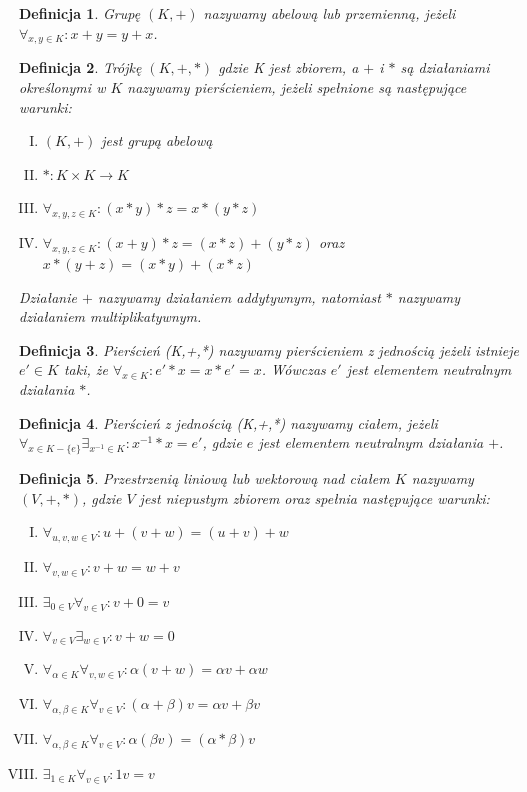 \documentclass[12pt,a4paper]{article}
\newtheorem{df}{Definicja}[section]
\begin{document}
\begin{df} 
Grup\k{e} $(K,+)$ nazywamy abelow\k{a} lub przemienn\k{a}, je\.zeli $\forall_{x,y\in K}: x+y=y+x$.
\end{df}
\begin{df} 
Tr\'ojk\k{e} $(K,+,*)$ gdzie K jest zbiorem, a $+$ i $*$ s\k{a} dzia{\l}aniami okre\'slonymi w $K$ nazywamy pier\'scieniem, je\.zeli spe{\l}nione s\k{a} nast\k{e}puj\k{a}ce warunki:
\begin{enumerate}[I.]
\item $(K,+)$ jest grup\k{a} abelow\k{a} 
\item $*:K\times K \rightarrow K$ 
\item $\forall_{x,y,z\in K}: (x*y)*z=x*(y*z)$
\item $\forall_{x,y,z\in K}: (x+y)*z=(x*z)+(y*z)$ oraz $x*(y+z)=(x*y)+(x*z)$
\end{enumerate}
Dzia{\l}anie $+$ nazywamy dzia{\l}aniem addytywnym, natomiast $*$ nazywamy dzia{\l}aniem multiplikatywnym.
\end{df}
\begin{df} 
Pier\'scie\'n (K,+,*) nazywamy pier\'scieniem z jedno\'sci\k{a} je\.zeli istnieje $e'\in K$ taki, \.ze $\forall_{x\in K}: e'*x=x*e'=x$. W\'owczas $e'$ jest elementem neutralnym dzia{\l}ania $*$.
\end{df}
\begin{df} 
Pier\'scie\'n z jedno\'sci\k{a} (K,+,*) nazywamy cia{\l}em, je\.zeli $\forall_{x\in K-\{e\}} \exists_{x^{-1}\in K}: x^{-1}*x=e'$, gdzie $e$ jest elementem neutralnym działania $+$.
\end{df}
\begin{df}
Przestrzeni\k{a} liniow\k{a} lub wektorow\k{a} nad cia{\l}em $K$ nazywamy $(V, +, *)$, gdzie $V$ jest niepustym zbiorem oraz spe{\l}nia nast\k{e}puj\k{a}ce warunki:
\begin{enumerate}[I.]
\item $\forall_{u, v, w \in V}: u + (v + w) = (u + v) + w$
\item $\forall_{v, w \in V}: v + w = w + v$
\item $\exists_{0 \in V} \forall_{v \in V}: v + 0 = v$
\item $\forall_{v \in V} \exists_{w \in V}: v + w = 0$
\item $\forall_{\alpha \in K} \forall_{v, w \in V}: \alpha(v + w) = \alpha v + \alpha w$
\item $\forall_{\alpha, \beta \in K} \forall_{v \in V}: (\alpha + \beta)v = \alpha v + \beta v$
\item $\forall_{\alpha, \beta \in K} \forall_{v \in V}: \alpha(\beta v) = (\alpha*\beta)v$
\item $\exists_{1 \in K} \forall_{v \in V}: 1v = v$
\end{enumerate}
\end{df}
\end{document}
